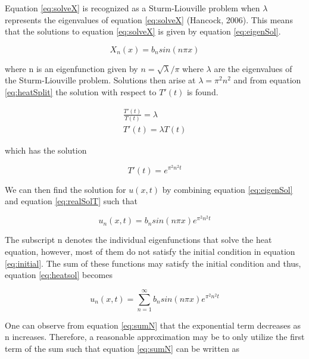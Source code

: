 \documentclass[12pt,a4paper]{article}
\begin{document}
\noindent Equation \ref{eq:solveX} is recognized as a Sturm-Liouville problem when $\lambda$ represents the eigenvalues of equation \ref{eq:solveX} (Hancock, 2006). This means that the solutions to equation \ref{eq:solveX} is given by equation \ref{eq:eigenSol}.

\begin{equation}\label{eq:eigenSol}
X_n(x)= b_n sin(n\pi x)
\end{equation}

\noindent where n is an eigenfunction given by $n = \sqrt{\lambda}/\pi$ where $\lambda$ are the eigenvalues of the Sturm-Liouville problem. Solutions then arise at $\lambda = \pi^2 n^2$ and from equation \ref{eq:heatSplit} the solution with respect to $T'(t)$ is found.

\begin{equation}\label{eq:eigenSolT}
\begin{aligned}
\frac{T'(t)}{T(t)} = \lambda
\\
T'(t) = \lambda T(t)
\end{aligned}
\end{equation}

\noindent which has the solution

\begin{equation}\label{eq:realSolT}
T'(t) = e^{\pi^2 n^2 t}
\end{equation}

\noindent We can then find the solution for $u(x,t)$ by combining equation \ref{eq:eigenSol} and equation \ref{eq:realSolT} such that

\begin{equation}\label{eq:heatsol}
u_n(x,t) = b_n sin(n\pi x)e^{\pi^2 n^2 t}
\end{equation}

\noindent The subscript n denotes the individual eigenfunctions that solve the heat equation, however, most of them do not satisfy the initial condition in equation \ref{eq:initial}. The sum of these functions may satisfy the initial condition and thus, equation \ref{eq:heatsol} becomes

\begin{equation}\label{eq:sumN}
u_n(x,t) = \sum_{n=1}^{\infty} b_n sin(n\pi x)e^{\pi^2 n^2 t}
\end{equation}

\noindent One can observe from equation \ref{eq:sumN} that the exponential term decreases as n increases. Therefore, a reasonable approximation may be to only utilize the first term of the sum such that equation \ref{eq:sumN} can be written as
\end{document}
